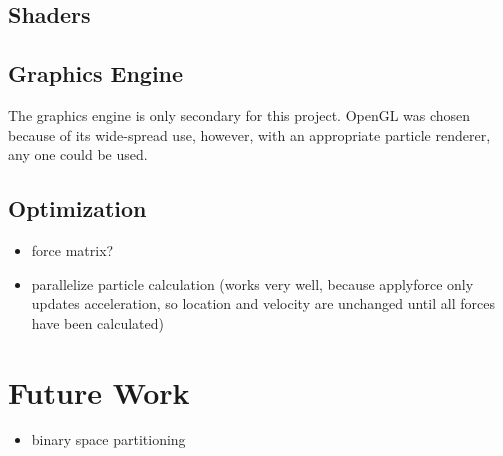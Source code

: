 \documentclass[runningheads,a4paper]{llncs}
\begin{document}
\subsection{Shaders}

\subsection{Graphics Engine}
The graphics engine is only secondary for this project. OpenGL was chosen because of its wide-spread use, however, with an appropriate particle renderer, any one could be used.

\subsection{Optimization}
\begin{itemize}
\item force matrix? 
\item parallelize particle calculation (works very well, because applyforce only updates acceleration, so location and velocity are unchanged until all forces have been calculated)
\end{itemize}

\section{Future Work}
\begin{itemize}
\item binary space partitioning
\end{itemize}





\end{document}
